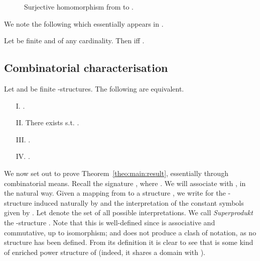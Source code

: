 \documentclass{LMCS}
\begin{document}
\begin{figure*}
  \centering
 \hspace{1cm}  \hspace{1cm}

  \caption{Surjective homomorphism from  to .}
  \label{fig:k23toh2}
\end{figure*}
\noindent We note the following which essentially appears in \cite{Keisler65}.
\begin{thm}
Let  be finite and  of any cardinality. Then  iff .
\end{thm}

\subsection{Combinatorial characterisation}
\label{sec:comb}
\begin{thm}\label{theo:main:result}
  Let  and  be finite -structures. The following are equivalent.
  \begin{enumerate}[label=\Roman*.]
  \item[I.] .
  \item[II.] There exists  s.t. .
  \item[III.] .
  \item[IV.] .
  \end{enumerate}
\end{thm}
\noindent We now set out to prove Theorem~\ref{theo:main:result}, essentially through combinatorial means. Recall the signature , where . We will associate  with , in the natural way. Given a mapping  from  to a structure , we
write  for the -structure induced naturally by  and the
interpretation of the constant symbols given by . Let 
denote the set of  all possible interpretations. We call \emph{Superprodukt} the -structure . Note that this is well-defined since  is associative and commutative, up to isomorphism; and does not produce a clash of notation, as no structure  has been defined. From its definition it is clear to see that  is some kind of enriched power structure of  (indeed, it shares a  domain with ).
\end{document}
